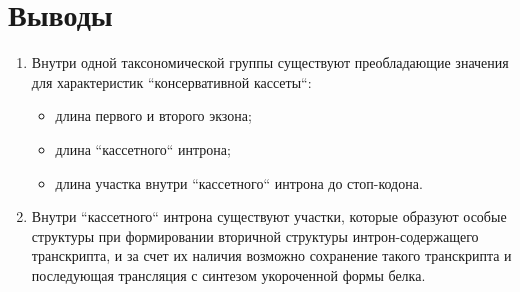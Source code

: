 \clearpage
\section{Выводы}

\begin{enumerate}[left=\parindent]
    \item Внутри одной таксономической группы существуют преобладающие значения для характеристик ``консервативной кассеты``:
    \begin{itemize}
        \item длина первого и второго экзона;
        \item длина ``кассетного`` интрона;
        \item длина участка внутри ``кассетного`` интрона до стоп-кодона.
    \end{itemize}
    \item Внутри ``кассетного`` интрона существуют участки, которые образуют особые структуры при формировании вторичной структуры интрон-содержащего транскрипта, и за счет их наличия возможно сохранение такого транскрипта и последующая трансляция с синтезом укороченной формы белка.
\end{enumerate}
